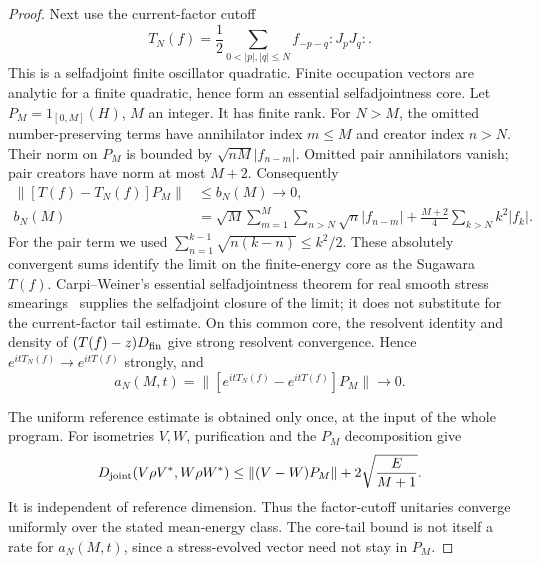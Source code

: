 \begin{proof}
Next use the current-factor cutoff
\[
 T_N(f)=\frac12\sum_{0<|p|,|q|\leq N}
                       f_{-p-q}:J_pJ_q:.
\]
This is a selfadjoint finite oscillator quadratic. Finite occupation
vectors are analytic for a finite quadratic, hence form an essential
selfadjointness core. Let $P_M=1_{[0,M]}(H)$, $M$ an integer. It has
finite rank. For $N>M$, the omitted number-preserving terms have
annihilator index $m\leq M$ and creator index $n>N$. Their norm on
$P_M$ is bounded by $\sqrt{nM}|f_{n-m}|$.
Omitted pair annihilators vanish; pair creators have norm at most
$M+2$. Consequently
\begin{align*}
 \|[T(f)-T_N(f)]P_M\|&\leq b_N(M)\longrightarrow0,\\
 b_N(M)&=\sqrt M\sum_{m=1}^M\sum_{n>N}\sqrt n|f_{n-m}|
       +\frac{M+2}{4}\sum_{k>N}k^2|f_k|.
\end{align*}
For the pair term we used
$\sum_{n=1}^{k-1}\sqrt{n(k-n)}\leq k^2/2$.
These absolutely convergent sums identify the limit on the
finite-energy core as the Sugawara $T(f)$.
Carpi--Weiner's essential selfadjointness theorem for real smooth
stress smearings~\cite[Theorem~4.4]{CarpiWeiner2005} supplies the selfadjoint closure of the limit; it
does not substitute for the current-factor tail estimate.
On this common core, the resolvent identity and density of
$(T(f)-z)D_{\rm fin}$ give strong resolvent convergence.
Hence $e^{itT_N(f)}\to e^{itT(f)}$ strongly, and
\[
 a_N(M,t)=\|[e^{itT_N(f)}-e^{itT(f)}]P_M\|\longrightarrow0.
\]

The uniform reference estimate is obtained only once, at the input
of the whole program. For isometries $V,W$, purification and the
$P_M$ decomposition give
\[
 D_{\rm joint}(V\rho V^*,W\rho W^*)
 \leq\|(V-W)P_M\|+2\sqrt{\frac E{M+1}}.
\]
It is independent of reference dimension. Thus the factor-cutoff
unitaries converge uniformly over the stated mean-energy class.
The core-tail bound is not itself a rate for $a_N(M,t)$, since a
stress-evolved vector need not stay in $P_M$.


\end{proof}
